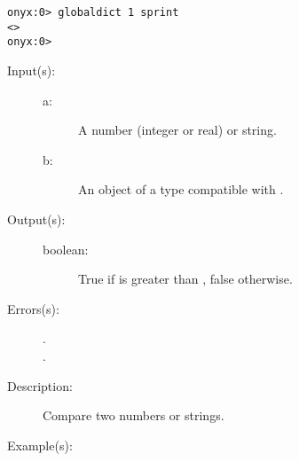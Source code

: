 \begin{description}
\begin{description}
\begin{verbatim}
onyx:0> globaldict 1 sprint
<>
onyx:0>
		\end{verbatim}
	\end{description}
\label{systemdict:gt}
\item[{\onyxop{a b}{gt}{boolean}}: ]
	\begin{description}\item[]
	\item[Input(s): ]
		\begin{description}\item[]
		\item[a: ]
			A number (integer or real) or string.
		\item[b: ]
			An object of a type compatible with .
		\end{description}
	\item[Output(s): ]
		\begin{description}\item[]
		\item[boolean: ]
			True if  is greater than , false
			otherwise.
		\end{description}
	\item[Errors(s): ]
		\begin{description}\item[]
		\item[.]
		\item[.]
		\end{description}
	\item[Description: ]
		Compare two numbers or strings.
	\item[Example(s): ]\begin{verbatim}


\end{verbatim}
\end{description}
\end{description}
